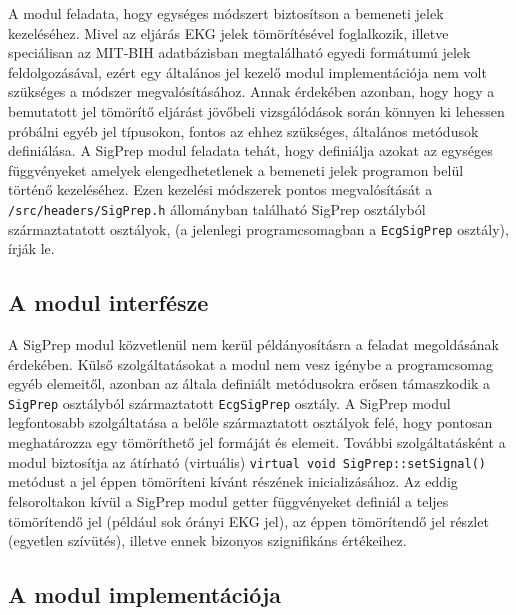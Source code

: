 \documentclass[oneside,titlepage,12pt,a4paper]{report}
\begin{document}
\par A modul feladata, hogy egységes módszert biztosítson a bemeneti jelek kezeléséhez. 
Mivel az eljárás EKG jelek tömörítésével foglalkozik, illetve speciálisan az MIT-BIH adatbázisban megtalálható egyedi formátumú jelek feldolgozásával, 
ezért egy általános jel kezelő modul implementációja nem volt szükséges a módszer megvalósításához. Annak érdekében azonban, hogy 
hogy a bemutatott jel tömörítő eljárást jövőbeli vizsgálódások során könnyen ki lehessen próbálni egyéb jel típusokon, fontos az ehhez szükséges, általános metódusok definiálása. A SigPrep modul feladata tehát, hogy definiálja azokat az egységes függvényeket amelyek elengedhetetlenek a bemeneti jelek programon belül történő kezeléséhez. Ezen kezelési módszerek pontos megvalósítását a \texttt{/src/headers/SigPrep.h} állományban található SigPrep osztályból származtatatott osztályok, (a jelenlegi programcsomagban a \texttt{EcgSigPrep} osztály), írják le. 

\subsection*{A modul interfésze}

\par A SigPrep modul közvetlenül nem kerül példányosításra a feladat megoldásának érdekében. Külső szolgáltatásokat a modul nem vesz igénybe a programcsomag egyéb elemeitől, azonban az általa definiált metódusokra erősen támaszkodik a \texttt{SigPrep} osztályból származtatott \texttt{EcgSigPrep} osztály. A SigPrep modul legfontosabb szolgáltatása a belőle származtatott osztályok felé, hogy pontosan meghatározza egy tömöríthető jel formáját és elemeit. További szolgáltatásként a modul biztosítja az átírható (virtuális) \texttt{virtual void SigPrep::setSignal()} metódust a jel éppen tömöríteni kívánt részének inicializásához. Az eddig felsoroltakon kívül a SigPrep modul getter függvényeket definiál a teljes tömörítendő jel (például sok órányi EKG jel), az éppen tömörítendő jel részlet (egyetlen szívütés), illetve ennek bizonyos szignifikáns értékeihez. 

\subsection*{A modul implementációja}
\end{document}
